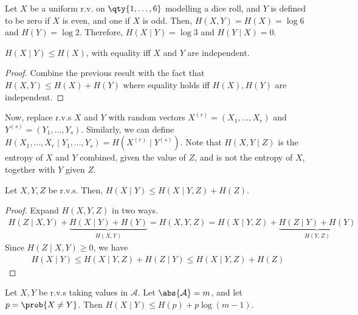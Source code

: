 \begin{example}
    Let $X$ be a uniform r.v. on $\qty{1, \dots, 6}$ modelling a dice roll, and $Y$ is defined to be zero if $X$ is even, and one if $X$ is odd.
    Then, $H(X,Y) = H(X) = \log 6$ and $H(Y) = \log 2$.
    Therefore, $H(X \mid Y) = \log 3$ and $H(Y \mid X) = 0$.
\end{example}

\begin{corollary}
    $H(X\mid Y) \leq H(X)$, with equality iff $X$ and $Y$ are independent.
\end{corollary}

\begin{proof}
    Combine the previous result with the fact that $H(X,Y) \leq H(X) + H(Y)$ where equality holds iff $H(X), H(Y)$ are independent.
\end{proof}

Now, replace r.v.s $X$ and $Y$ with random vectors $X^{(r)} = (X_1, \dots, X_r)$ and $Y^{(s)} = (Y_1, \dots, Y_s)$.
Similarly, we can define $H(X_1, \dots, X_r \mid Y_1, \dots, Y_s) = H(X^{(r)} \mid Y^{(s)})$.
Note that $H(X,Y\mid Z)$ is the entropy of $X$ and $Y$ combined, given the value of $Z$, and is not the entropy of $X$, together with $Y$ given $Z$.

\begin{lemma}
    Let $X, Y, Z$ be r.v.s.
    Then, $H(X \mid Y) \leq H(X \mid Y, Z) + H(Z)$.
\end{lemma}

\begin{proof}
    Expand $H(X,Y,Z)$ in two ways.
    \begin{align*}
        H(Z \mid X,Y) + \underbrace{H(X\mid Y) + H(Y)}_{H(X,Y)} = H(X,Y,Z) = H(X \mid Y,Z) + \underbrace{H(Z \mid Y) + H(Y)}_{H(Y,Z)}
    \end{align*}
    Since $H(Z \mid X,Y) \geq 0$, we have
    \begin{align*}
        H(X \mid Y) \leq H(X \mid Y,Z) + H(Z \mid Y) \leq H(X \mid Y,Z) + H(Z)
    \end{align*}
\end{proof}

\begin{proposition}
    Let $X, Y$ be r.v.s taking values in $\mathcal A$.
    Let $\abs{\mathcal A} = m$, and let $p = \prob{X \neq Y}$.
    Then $H(X \mid Y) \leq H(p) + p \log(m-1)$.
\end{proposition}

